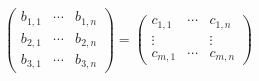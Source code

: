\documentclass[t]{beamer}
\begin{document}
\begin{frame}
{\begin{displaymath}
\begin{pmatrix}
        b_{1,1} & \cdots & b_{1,n} \\
        b_{2,1} & \cdots & b_{2,n} \\
        b_{3,1} & \cdots & b_{3,n}
      \end{pmatrix} =
      \begin{pmatrix}
        c_{1,1} & \cdots & c_{1,n} \\
        \vdots & & \vdots \\
        c_{m,1} & \cdots & c_{m,n}
      \end{pmatrix}
    \end{displaymath}
  }
  
\end{frame}

\begin{frame}
  \frametitle{}

\end{frame}

\begin{frame}
  \frametitle{}

\end{frame}

\begin{frame}
  \frametitle{}

\end{frame}

\begin{frame}
  \frametitle{}

\end{frame}
\end{document}
